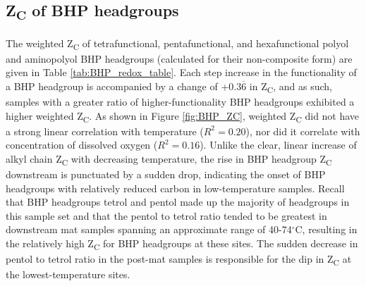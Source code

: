 \subsection{Z\textsubscript{C} of BHP headgroups}

The weighted Z\textsubscript{C} of tetrafunctional, pentafunctional, and hexafunctional polyol and aminopolyol BHP headgroups (calculated for their non-composite form) are given in Table \ref{tab:BHP_redox_table}. Each step increase in the functionality of a BHP headgroup is accompanied by a change of +$0.3\overline{6}$ in Z\textsubscript{C}, and as such, samples with a greater ratio of higher-functionality BHP headgroups exhibited a higher weighted Z\textsubscript{C}. As shown in Figure \ref{fig:BHP_ZC}, weighted Z\textsubscript{C} did not have a strong linear correlation with temperature ($R^{2} = 0.20$), nor did it correlate with concentration of dissolved oxygen ($R^{2} = 0.16$). Unlike the clear, linear increase of alkyl chain Z\textsubscript{C} with decreasing temperature, the rise in BHP headgroup Z\textsubscript{C} downstream is punctuated by a sudden drop, indicating the onset of BHP headgroups with relatively reduced carbon in low-temperature samples. Recall that BHP headgroups tetrol and pentol made up the majority of headgroups in this sample set and that the pentol to tetrol ratio tended to be greatest in downstream mat samples spanning an approximate range of 40-74$^{\circ}$C, resulting in the relatively high Z\textsubscript{C} for BHP headgroups at these sites. The sudden decrease in pentol to tetrol ratio in the post-mat samples is responsible for the dip in Z\textsubscript{C} at the lowest-temperature sites.

